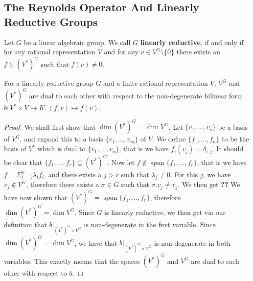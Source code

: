 \subsection{The Reynolds Operator And Linearly Reductive Groups}

\begin{definition}
  Let $G$ be a linear algebraic group.
  We call $G$ \textbf{linearly reductive}, if and only if for any rational representation $V$ and for any $v \in V^G \setminus \{ 0 \}$ there exists an $f \in \left( V^\ast \right)^G $ such that $f(v) \neq 0$.
\end{definition}

\begin{proposition}\label{dual}
  For a linearly reductive group $G$ and a finite rational representation $V$, $V^G$ and $(V^\ast)^G$ are dual to each other with respect to the non-degenerate bilinear form $ b\colon V^\ast \times V \longrightarrow K, (f,v) \mapsto f(v)$.
\end{proposition}

\begin{proof}
  We shall first show that $\operatorname{dim}(V^\ast)^G = \operatorname{dim}V^G$.
  Let $\{v_1, \ldots , v_r \}$ be a basis of $V^G$, and expand this to a basis $\{v_1, \ldots , v_m \}$ of $V$.
  We define $\{ f_1 , \ldots , f_n \}$ to be the basis of $V^\ast$ which is dual to $\{v_1, \ldots , v_n \}$, that is we have $ f_i (v_j) = \delta_{i,j} $.
  It should be clear that $\{f_1, \ldots , f_r \} \subseteq (V^\ast)^G$.
  Now let $f \notin \operatorname{span} \{ f_1, \ldots, f_r\}$, that is we have $f = \Sigma_{i=1}^n \lambda_i f_i $, and there exists a $j > r$ such that $ \lambda_j \neq 0$.
  For this $j$, we have $v_j \notin V^G$, therefore there exists a $\sigma \in G$ such that $\sigma . v_j \neq v_j$.
  We then get \textbf{??}
  We have now shown that $(V^\ast)^G = \operatorname{span}\{f_1,\dots,f_r\}$, therefore $\operatorname{dim}(V^\ast)^G = \operatorname{dim}V^G$.
  Since $G$ is linearly reductive, we then get via our definition that $\left. b \right|_{(V^\ast)^G \times V^G}$ is non-degenerate in the first variable.
  Since $\operatorname{dim}(V^\ast)^G = \operatorname{dim}V^G$, we have that $\left. b \right|_{(V^\ast)^G \times V^G}$ is non-degenerate in both variables.
  This exactly means that the spaces $(V^\ast)^G$ and $V^G$ are dual to each other with respect to $b$.
\end{proof}


